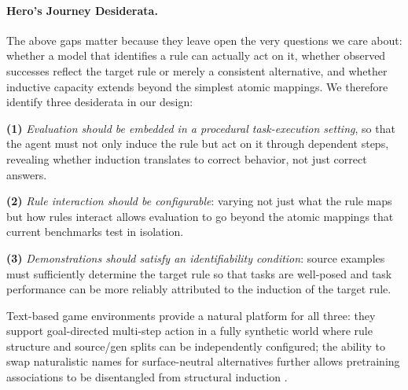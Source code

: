 \documentclass[11pt]{article}
\newcommand{\AS}{{\sc Hero's Journey}\xspace}
\newcommand\jl[1]{\todo[color=blue!40]{{\bf Jessy}: #1}}
\begin{document}
\paragraph{\AS Desiderata.}
The above gaps matter because they leave open the very questions we care about: whether a model that identifies a rule can actually act on it, whether observed successes reflect the target rule or merely a consistent alternative, and whether inductive capacity extends beyond the simplest atomic mappings. 
We therefore identify three desiderata in our design:

\textbf{(1)} \textit{Evaluation should be embedded in a procedural task-execution setting}, so that the agent must not only induce the rule but act on it through dependent steps, revealing whether induction translates to correct behavior, not just correct answers.

\textbf{(2)} \textit{Rule interaction should be configurable}: varying not just what the rule maps but how rules interact allows evaluation to go beyond the atomic mappings that current benchmarks test in isolation.

\textbf{(3)} \textit{Demonstrations should satisfy an identifiability condition}: source examples must sufficiently determine the target rule so that tasks are well-posed and task performance can be more reliably attributed to the induction of the target rule.

Text-based game environments \citep{cote2018textworld, chevalier-boisvert2019babyai,hausknecht2020interactive, agentodyssey2026} provide a natural platform for all three: they support goal-directed multi-step action in a fully synthetic world where rule structure and source/gen splits can be independently configured; the ability to swap naturalistic names for surface-neutral alternatives further allows pretraining associations to be disentangled from structural induction \citep{min-etal-2022-rethinking}. 

\end{document}
